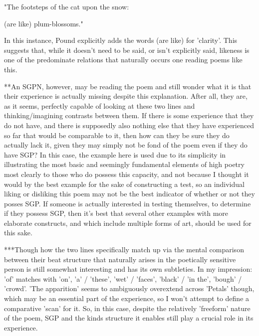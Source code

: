 \documentclass[]{article}
\begin{document}
"The footsteps of the cat upon the snow: 

(are like) plum-blossoms." 

In this instance, Pound explicitly adds  the words (are like) for 'clarity'. This suggests that, while it doesn't need to be said, or isn't explicitly said, likeness is one of the predominate relations that naturally occurs one reading poems like this.



**An SGPN, however, may be reading the poem and still wonder what it is that their experience is actually missing despite this explanation. After all, they are, as it seems, perfectly capable of looking at these two lines and thinking/imagining contrasts between them. If there is some experience that they do not have, and there is supposedly also nothing else that they have experienced so far that would be comparable to it, then how can they be sure they do actually lack it, given they may simply not be fond of the poem even if they do have SGP? In this case, the example here is used due to its simplicity in illustrating the most basic and seemingly fundamental elements of high poetry most clearly to those who do possess this capacity, and not because I thought it would by the best example for the sake of constructing a test, so an individual liking or disliking this poem may not be the best indicator of whether or not they posses SGP. If someone is actually interested in testing themselves, to determine if they possess SGP, then it's best that several other examples with more elaborate constructs, and which include multiple forms of art, should be used for this sake.



***Though how the two lines specifically match up via the mental comparison between their beat structure that naturally arises in the poetically sensitive person is still somewhat interesting and has its own subtleties. In my impression: 'of' matches with 'on', 'a' / 'these', 'wet' / 'faces', 'black' / 'in the', 'bough' / 'crowd'. 'The apparition' seems to ambiguously overextend across 'Petals' though, which may be an essential part of the experience, so I won't attempt to define a comparative 'scan' for it. So, in this case, despite the relatively 'freeform' nature of the poem, SGP and the kinds structure it enables still play a crucial role in its experience.



\section{}
\end{document}
